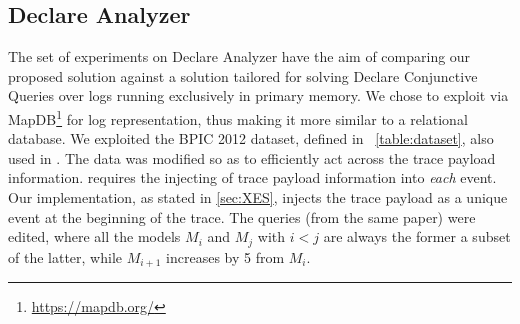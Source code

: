 \subsection{Declare Analyzer}\label{ssec:declan}
The set of experiments on Declare Analyzer have the aim of comparing our proposed solution against a solution tailored for solving Declare Conjunctive Queries over logs running exclusively in primary memory. We chose to exploit via MapDB\footnote{\url{https://mapdb.org/}} for log representation, thus making it more similar to a relational database. %
We exploited the {BPIC 2012} dataset, defined in \tablename~\ref{table:dataset}, also used in \cite{BurattinMS16}. {The data was modified so as to efficiently act across the trace payload information. \cite{BurattinMS16} requires the injecting of trace payload information into \textit{each} event. Our implementation, as stated in \ref{sec:XES}, injects the trace payload as a unique event at the beginning of the trace. } %
 The queries (from the same paper) %
 were edited, where all the models $M_i$ and $M_j$ with $i<j$ are always the former a subset of the latter, while $M_{i+1}$ increases by 5 from %
   $M_i$. 
%
